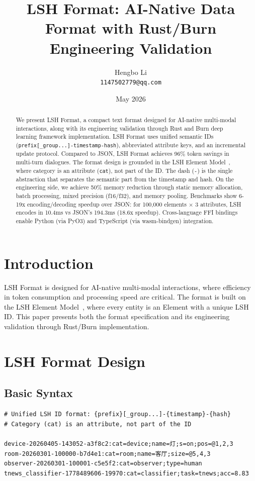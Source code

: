 \documentclass{article}
\title{LSH Format: AI-Native Data Format with Rust/Burn Engineering Validation}
\author{Hengbo Li\\
\texttt{1147502779@qq.com}
}
\date{May 2026}
\begin{document}
\maketitle

\begin{abstract}
We present LSH Format, a compact text format designed for AI-native multi-modal interactions, along with its engineering validation through Rust and Burn deep learning framework implementation. LSH Format uses unified semantic IDs (\texttt{prefix[\_group...]-timestamp-hash}), abbreviated attribute keys, and an incremental update protocol. Compared to JSON, LSH Format achieves 96\% token savings in multi-turn dialogues. The format design is grounded in the LSH Element Model~\cite{lsh-three-layer}, where category is an attribute (\texttt{cat}), not part of the ID. The dash (\texttt{-}) is the single abstraction that separates the semantic part from the timestamp and hash. On the engineering side, we achieve 50\% memory reduction through static memory allocation, batch processing, mixed precision (f16/f32), and memory pooling. Benchmarks show 6-19x encoding/decoding speedup over JSON: for 100,000 elements $\times$ 3 attributes, LSH encodes in 10.4ms vs JSON's 194.3ms (18.6x speedup). Cross-language FFI bindings enable Python (via PyO3) and TypeScript (via wasm-bindgen) integration.
\end{abstract}

\section{Introduction}

LSH Format is designed for AI-native multi-modal interactions, where efficiency in token consumption and processing speed are critical. The format is built on the LSH Element Model~\cite{lsh-three-layer}, where every entity is an Element with a unique LSH ID. This paper presents both the format specification and its engineering validation through Rust/Burn implementation.

\section{LSH Format Design}

\subsection{Basic Syntax}

\begin{verbatim}
# Unified LSH ID format: {prefix}[_group...]-{timestamp}-{hash}
# Category (cat) is an attribute, not part of the ID

device-20260405-143052-a3f8c2:cat=device;name=灯;s=on;pos=@1,2,3
room-20260301-100000-b7d4e1:cat=room;name=客厅;size=@5,4,3
observer-20260301-100001-c5e5f2:cat=observer;type=human
tnews_classifier-1778489606-19970:cat=classifier;task=tnews;acc=8.83
\end{verbatim}
\end{document}
